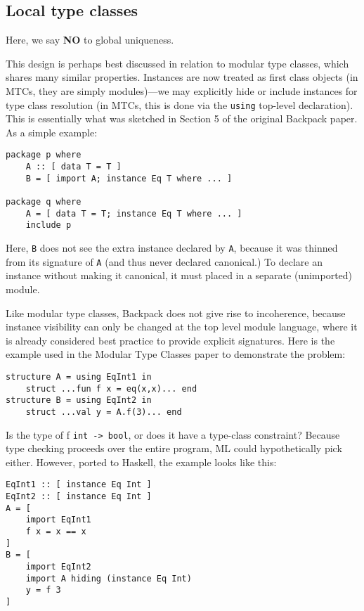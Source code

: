 \documentclass{article}
\begin{document}
\subsection{Local type classes}

Here, we say \textbf{NO} to global uniqueness.

This design is perhaps best discussed in relation to modular type
classes, which shares many similar properties.  Instances are now
treated as first class objects (in MTCs, they are simply modules)---we
may explicitly hide or include instances for type class resolution (in
MTCs, this is done via the \verb|using| top-level declaration).  This is
essentially what was sketched in Section 5 of the original Backpack
paper.  As a simple example:

\begin{verbatim}
package p where
    A :: [ data T = T ]
    B = [ import A; instance Eq T where ... ]

package q where
    A = [ data T = T; instance Eq T where ... ]
    include p
\end{verbatim}

Here, \verb|B| does not see the extra instance declared by \verb|A|,
because it was thinned from its signature of \verb|A| (and thus never
declared canonical.)  To declare an instance without making it
canonical, it must placed in a separate (unimported) module.

Like modular type classes, Backpack does not give rise to incoherence,
because instance visibility can only be changed at the top level module
language, where it is already considered best practice to provide
explicit signatures.  Here is the example used in the Modular Type
Classes paper to demonstrate the problem:

\begin{verbatim}
structure A = using EqInt1 in
    struct ...fun f x = eq(x,x)... end
structure B = using EqInt2 in
    struct ...val y = A.f(3)... end
\end{verbatim}

Is the type of f \verb|int -> bool|, or does it have a type-class
constraint?  Because type checking proceeds over the entire program, ML
could hypothetically pick either.  However, ported to Haskell, the
example looks like this:

\begin{verbatim}
EqInt1 :: [ instance Eq Int ]
EqInt2 :: [ instance Eq Int ]
A = [
    import EqInt1
    f x = x == x
]
B = [
    import EqInt2
    import A hiding (instance Eq Int)
    y = f 3
]
\end{verbatim}
\end{document}

